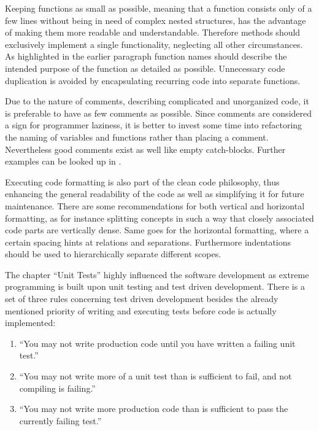 Keeping functions as small as possible, meaning that a function consists only of a few lines without being in need of complex 
nested structures, has the advantage of making them more readable and understandable. Therefore methods should exclusively implement a single functionality, 
neglecting all other circumstances. As highlighted in the earlier paragraph function names should describe the intended purpose of the function as detailed as possible. 
Unnecessary code duplication is avoided by encapsulating recurring code into separate functions.

Due to the nature of comments, describing complicated and unorganized code, it is preferable to have as few comments as possible.
Since comments are considered a sign for programmer laziness, it is better to invest some time into refactoring the naming of variables
and functions rather than placing a comment. Nevertheless good comments exist as well like empty catch-blocks. Further examples can be looked up in 
\cite{CLEANCODE}.

Executing code formatting is also part of the clean code philosophy, thus enhancing the general readability of the code as well as simplifying 
it for future maintenance. There are some recommendations for both vertical and horizontal formatting, as for instance splitting concepts in 
such a way that closely associated code parts are vertically dense. Same goes for the horizontal formatting, where a certain spacing hints at 
relations and separations. Furthermore indentations should be used to hierarchically separate different scopes.

The chapter ``Unit Tests'' highly influenced the software development as extreme programming is built upon unit testing 
and test driven development. There is a set of three rules concerning test driven development besides the already mentioned priority of writing 
and executing tests before code is actually implemented:

\begin{enumerate}
 \item ``You may not write production code until you have written a failing unit test.''
 \item ``You may not write more of a unit test than is sufficient to fail, and not compiling is failing.''
 \item ``You may not write more production code than is sufficient to pass the currently failing test.''
\end{enumerate}

